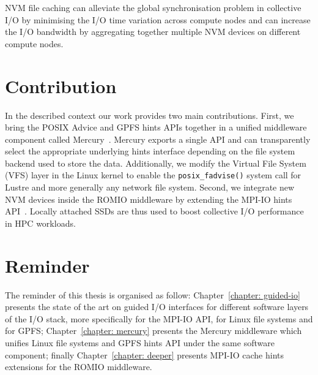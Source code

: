 NVM file caching can alleviate the global synchronisation problem in collective I/O by minimising the I/O time variation across compute nodes and can increase the I/O bandwidth by aggregating together multiple NVM devices on different compute nodes.

\section{Contribution} \label{sec: contribution}
In the described context our work provides two main contributions. First, we bring the POSIX Advice and GPFS hints APIs together in a unified middleware component called Mercury~\cite{CongiuGPMSB}. Mercury exports a single API and can transparently select the appropriate underlying hints interface depending on the file system backend used to store the data. Additionally, we modify the Virtual File System (VFS) layer in the Linux kernel to enable the \texttt{posix\_fadvise()} system call for Lustre and more generally any network file system. Second, we integrate new NVM devices inside the ROMIO middleware by extending the MPI-IO hints API~\cite{CongiuNSB}. Locally attached SSDs are thus used to boost collective I/O performance in HPC workloads.

\section{Reminder}
The reminder of this thesis is organised as follow: Chapter~\ref{chapter: guided-io} presents the state of the art on guided I/O interfaces for different software layers of the I/O stack, more specifically for the MPI-IO API, for Linux file systems and for GPFS; Chapter~\ref{chapter: mercury} presents the Mercury middleware which unifies Linux file systems and GPFS hints API under the same software component; finally Chapter~\ref{chapter: deeper} presents MPI-IO cache hints extensions for the ROMIO middleware. 
